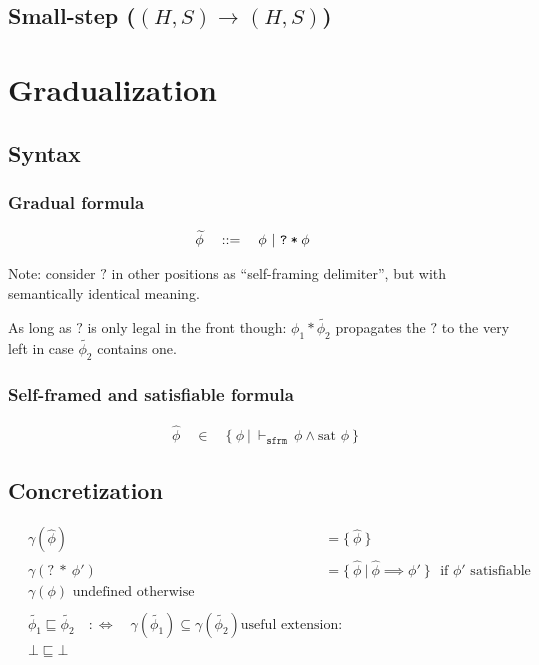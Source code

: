\documentclass[11pt,a4paper]{article}
\newcommand{\ttt}{\texttt}
\newcommand{\sfrmphi}{\ensuremath{\vdash_\texttt{sfrm}}\,}
\newcommand{\grad}[1]{\widetilde{#1}}
\newcommand{\qm}{\ttt{?}}
\newcommand{\withqm}[1]{\ttt{\qm\:*\:$#1$}}
\newcommand{\sstepGeneric}[5]{({#1}, {#2}) \rightarrow^{#3} ({#4}, {#5})}
\newcommand{\sstep}[4]{\sstepGeneric {#1} {#2} {} {#3} {#4}}
\begin{document}
\subsection{Small-step ($\sstep H S H S$)}


\section{Gradualization}
\subsection{Syntax}
\subsubsection{Gradual formula}
\begin{align*}
&\grad{\phi} \quad ::= \quad \phi ~|~ \withqm{\phi}
\end{align*}

Note: consider $?$ in other positions as ``self-framing delimiter'', but with semantically identical meaning.

As long as $?$ is only legal in the front though: $\phi_1 * \grad{\phi_2}$ propagates the $?$ to the very left in case $\grad{\phi_2}$ contains one.

\subsubsection{Self-framed and satisfiable formula}
\begin{align*}
&\hat{\phi} \quad \in \quad \{~ \phi ~|~ \sfrmphi \phi \wedge \text{sat~} \phi ~\}
\end{align*}

\subsection{Concretization}
\begin{align*}
&\gamma(\hat{\phi}) ~&&= \{~ \hat{\phi} ~\} \\
&\gamma(?\:*\:\phi') ~&&= \{~ \hat{\phi} ~|~ \hat{\phi} \implies \phi' ~\} \text{~~if $\phi'$ satisfiable} \\
&\gamma(\phi) \text{ undefined otherwise} \\
~\\
&\grad{\phi_1} \sqsubseteq \grad{\phi_2} \quad:\iff\quad \gamma(\grad{\phi_1}) \subseteq \gamma(\grad{\phi_2})
\text{useful extension:}\\
&\bot \sqsubseteq \bot
\end{align*}
\end{document}
